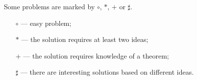 \documentclass[twoside]{book}
\begin{document}
\vfill

Some problems are marked by $\circ$, $*$, $+$ or $\sharp$.
\begin{itemize}
\item[$\circ$] --- easy problem;%
\item[$*$] --- the solution requires at least two ideas;%
\item[$+$] --- the solution requires knowledge of a theorem;%
\item[$\sharp$] --- there are interesting solutions based on different ideas.%
\end{itemize}











%
%


\backmatter
\newpage
{}
{\scriptsize

}
\sloppy
\printbibliography[heading=bibintoc]
\fussy
\end{document}
